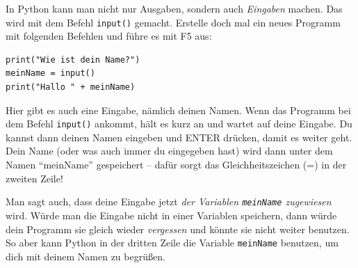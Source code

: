 	In Python kann man nicht nur Ausgaben, sondern auch \emph{Eingaben} machen. Das wird mit dem Befehl \texttt{input()} gemacht. Erstelle doch mal ein neues Programm mit folgenden Befehlen und führe es mit F5 aus:
	
	\begin{lstlisting}
print("Wie ist dein Name?")
meinName = input()
print("Hallo " + meinName)
	\end{lstlisting}
	
	Hier gibt es auch eine Eingabe, nämlich deinen Namen. Wenn das Programm bei dem Befehl \texttt{input()} ankommt, hält es kurz an und wartet auf deine Eingabe. Du kannst dann deinen Namen eingeben und ENTER drücken, damit es weiter geht. Dein Name (oder was auch immer du eingegeben hast) wird dann unter dem Namen \enquote{meinName} gespeichert – dafür sorgt das Gleichheitszeichen (=) in der zweiten Zeile! 
	
	Man sagt auch, dass deine Eingabe jetzt \emph{der Variablen \texttt{meinName} zugewiesen} wird. Würde man die Eingabe nicht in einer Variablen speichern, dann würde dein Programm sie gleich wieder \emph{vergessen} und könnte sie nicht weiter benutzen. So aber kann Python in der dritten Zeile die Variable \texttt{meinName} benutzen, um dich mit deinem Namen zu begrüßen.
	
